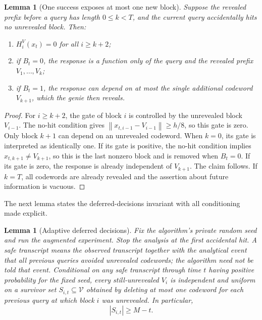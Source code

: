 \documentclass[11pt,a4paper]{article}
\newcommand{\norm}[1]{\left\lVert #1\right\rVert}
\newcommand{\cV}{\mathcal V}
\newtheorem{lemma}[theorem]{Lemma}
\theoremstyle{definition}
\theoremstyle{remark}
\begin{document}
\begin{lemma}[One success exposes at most one new block]\label{lem:oneblock}
Suppose the revealed prefix before a query has length $0\le k<T$, and the current query accidentally hits no unrevealed block.  Then:
\begin{enumerate}[label=(\roman*)]
\item $H_i^V(x_t)=0$ for all $i\ge k+2$;
\item if $B_t=0$, the response is a function only of the query and the revealed prefix $V_1,\ldots,V_k$;
\item if $B_t=1$, the response can depend on at most the single additional codeword $V_{k+1}$, which the genie then reveals.
\end{enumerate}
\end{lemma}

\begin{proof}
For $i\ge k+2$, the gate of block $i$ is controlled by the unrevealed block $V_{i-1}$.  The no-hit condition gives $\norm{x_{t,i-1}-V_{i-1}}\ge h/8$, so this gate is zero.  Only block $k+1$ can depend on an unrevealed codeword. When $k=0$, its gate is interpreted as identically one.  If its gate is positive, the no-hit condition implies $x_{t,k+1}\ne V_{k+1}$, so this is the last nonzero block and is removed when $B_t=0$.  If its gate is zero, the response is already independent of $V_{k+1}$.  The claim follows. If $k=T$, all codewords are already revealed and the assertion about future information is vacuous.
\end{proof}

The next lemma states the deferred-decisions invariant with all conditioning made explicit.

\begin{lemma}[Adaptive deferred decisions]\label{lem:deferred}
Fix the algorithm's private random seed and run the augmented experiment. Stop the analysis at the first accidental hit. A safe transcript means the observed transcript together with the analytical event that all previous queries avoided unrevealed codewords; the algorithm need not be told that event.  Conditional on any safe transcript through time $t$ having positive probability for the fixed seed, every still-unrevealed $V_i$ is independent and uniform on a survivor set $S_{i,t}\subseteq\cV$ obtained by deleting at most one codeword for each previous query at which block $i$ was unrevealed.  In particular,
\begin{equation}
 |S_{i,t}|\ge M-t.
 \label{eq:survivor}
\end{equation}
\end{lemma}
\end{document}
